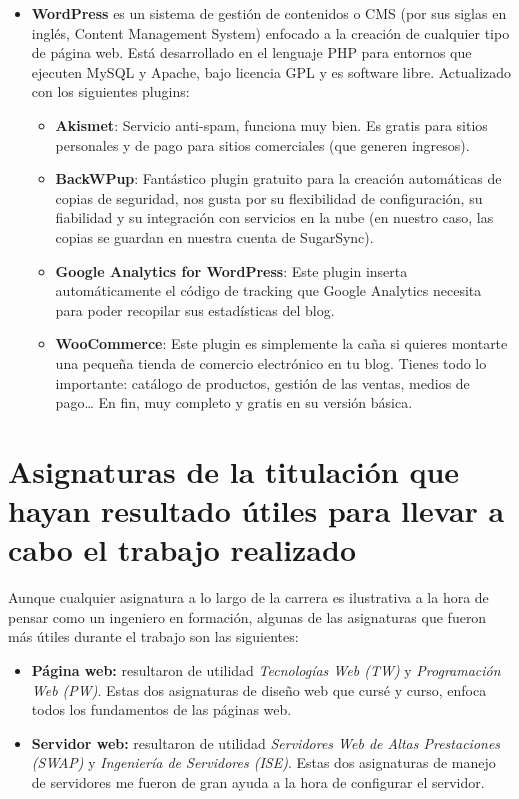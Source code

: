 		\begin{itemize}
			\item \textbf{WordPress} es un sistema de gestión de contenidos o CMS (por sus siglas en inglés, Content Management System) enfocado a la creación de cualquier tipo de página web. Está desarrollado en el lenguaje PHP para entornos que ejecuten MySQL y Apache, bajo licencia GPL y es software libre. Actualizado con los siguientes plugins:
			\begin{itemize}
				\item \textbf{Akismet}: Servicio anti-spam, funciona muy bien. Es gratis para sitios personales y de pago para sitios  comerciales (que generen ingresos). 
				\item \textbf{BackWPup}: Fantástico plugin gratuito para la creación automáticas de copias de seguridad, nos gusta por su flexibilidad de configuración, su fiabilidad y su integración con servicios en la nube (en nuestro caso, las copias se guardan en nuestra cuenta de SugarSync).
				\item \textbf{Google Analytics for WordPress}: Este plugin inserta automáticamente el código de tracking que Google Analytics necesita para poder recopilar sus estadísticas del blog.
				\item \textbf{WooCommerce}: Este plugin es simplemente la caña si quieres montarte una pequeña tienda de comercio electrónico en tu blog. Tienes todo lo importante: catálogo de productos, gestión de las ventas, medios de pago… En fin, muy completo y gratis en su versión básica.
			\end{itemize} 
		\end{itemize}
		
		
		
		\newpage
		
		\section{Asignaturas de la titulación que hayan resultado útiles para llevar a cabo el trabajo realizado}
		Aunque cualquier asignatura a lo largo de la carrera es ilustrativa a la hora de pensar como un ingeniero en formación, algunas de las asignaturas que fueron más útiles durante el trabajo son las siguientes:
		
		\begin{itemize}
			\item \textbf{Página web:} resultaron de utilidad \textit{Tecnologías Web (TW)} y \textit{Programación Web (PW)}. Estas dos asignaturas de diseño web que cursé y curso, enfoca todos los fundamentos de las páginas web.
			\item \textbf{Servidor web:} resultaron de utilidad \textit{Servidores Web de Altas Prestaciones (SWAP)} y \textit{Ingeniería de Servidores (ISE)}. Estas dos asignaturas de manejo de servidores me fueron de gran ayuda a la hora de configurar el servidor.
		\end{itemize}
		
